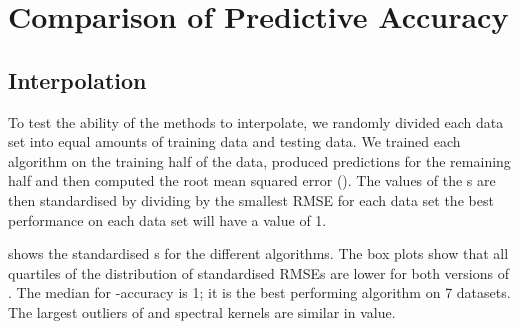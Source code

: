 \outbpdocument{


}


\iffalse

\section{Guide to the automatically generated reports}

Additional supplementary material to this paper is 13 reports automatically generated by \procedurename{}.
A link to these reports will be maintained at \url{http://mlg.eng.cam.ac.uk/lloyd/}.
We recommend that you read the report for `01-airline' first and review the reports that follow afterwards more briefly.
`02-solar' is discussed in the main text.
`03-mauna' analyses a dataset mentioned in the related work.
`04-wheat' demonstrates changepoints being used to capture heteroscedasticity.
`05-temperature' extracts an exactly periodic pattern from noisy data.
`07-call-centre' demonstrates a large discontinuity being modeled by a changepoint.
`10-sulphuric' combines many changepoints to create a highly structured model of the data.
`12-births' discovers multiple periodic components.

\fi


\iffalse


\section{Comparison of Predictive Accuracy}
\label{sec:accuracy-appendix}


\subsection{Interpolation}
\label{sec:interpolation-appendix}

To test the ability of the methods to interpolate, we randomly divided each data set into equal amounts of training data and testing data.
We trained each algorithm on the training half of the data, produced predictions for the remaining half and then computed the root mean squared error (\RMSE{}).
The values of the \RMSE{}s are then standardised by dividing by the smallest RMSE for each data set \ie the best performance on each data set will have a value of 1.

 shows the standardised \RMSE{}s for the different algorithms.
The box plots show that all quartiles of the distribution of standardised RMSEs are lower for both versions of \procedurename{}.
The median for \procedurename{}-accuracy is 1; it is the best performing algorithm on 7 datasets.
The largest outliers of \procedurename{} and spectral kernels are similar in value.

